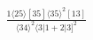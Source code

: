 \documentclass[varwidth, border=5pt]{standalone}
\begin{document}
\begin{my}
$\begin{gathered}
\scriptscriptstyle\frac{1⟨25⟩[35]⟨35⟩^2[13]}{⟨34⟩^2⟨3|1+2|3]^2}
\end{gathered}$
\end{my}
\end{document}
